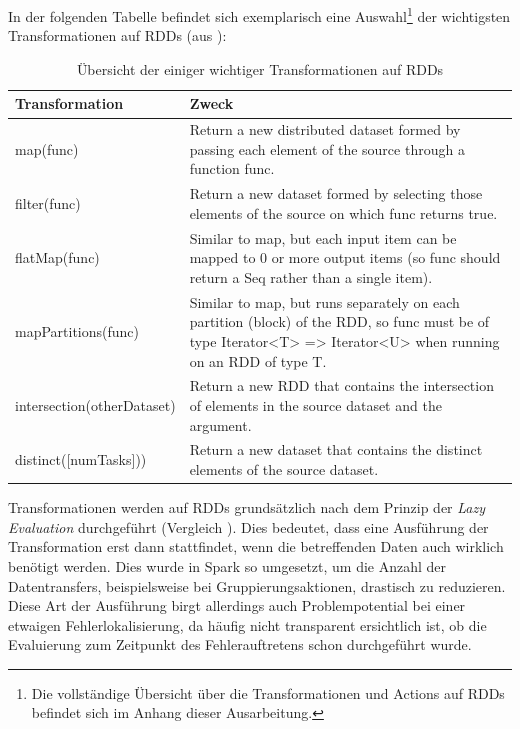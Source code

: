 In der folgenden Tabelle befindet sich exemplarisch eine Auswahl\footnote{Die vollständige Übersicht über die Transformationen und Actions auf RDDs befindet sich im Anhang dieser Ausarbeitung.} der wichtigsten Transformationen auf RDDs (aus ): 


\begin{table}[!ht]
\centering
\begin{tabular}{| p{5cm} | p{8cm} | }
\hline
Transformation & Zweck \\ \hline \hline
map(func) & Return a new distributed dataset formed by passing each element of the source through a function func.  \\ \hline 
filter(func) & Return a new dataset formed by selecting those elements of the source on which func returns true. \\ \hline 
flatMap(func) & Similar to map, but each input item can be mapped to 0 or more output items (so func should return a Seq rather than a single item).\\ \hline 
mapPartitions(func) & Similar to map, but runs separately on each partition (block) of the RDD, so func must be of type Iterator<T> => Iterator<U> when running on an RDD of type T. \\ \hline 
intersection(otherDataset) & Return a new RDD that contains the intersection of elements in the source dataset and the argument. \\ \hline 
distinct([numTasks])) & Return a new dataset that contains the distinct elements of the source dataset. \\ \hline 

\end{tabular}
\caption{Übersicht der einiger wichtiger Transformationen auf RDDs}
	\label{tab:transformations}
\end{table}

Transformationen werden auf RDDs grundsätzlich nach dem Prinzip der \textit{Lazy Evaluation} durchgeführt  (Vergleich ). Dies bedeutet, dass eine Ausführung der Transformation erst dann stattfindet, wenn die betreffenden Daten auch wirklich benötigt werden. Dies wurde in Spark so umgesetzt, um die Anzahl der Datentransfers, beispielsweise bei Gruppierungsaktionen, drastisch zu reduzieren. Diese Art der Ausführung birgt allerdings auch Problempotential bei einer etwaigen Fehlerlokalisierung, da häufig nicht transparent ersichtlich ist, ob die Evaluierung zum Zeitpunkt des Fehlerauftretens schon durchgeführt wurde. 



